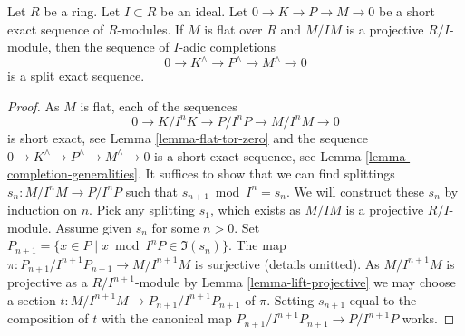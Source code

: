 \begin{lemma}
\label{lemma-split-completed-sequence}
Let $R$ be a ring. Let $I \subset R$ be an ideal.
Let $0 \to K \to P \to M \to 0$ be a short exact sequence of
$R$-modules. If $M$ is flat over $R$ and $M/IM$ is a projective
$R/I$-module, then the sequence of $I$-adic completions
$$
0 \to K^\wedge \to P^\wedge \to M^\wedge \to 0
$$
is a split exact sequence.
\end{lemma}

\begin{proof}
As $M$ is flat, each of the sequences
$$
0 \to K/I^nK \to P/I^nP \to M/I^nM \to 0
$$
is short exact, see
Lemma \ref{lemma-flat-tor-zero}
and the sequence $0 \to K^\wedge \to P^\wedge \to M^\wedge \to 0$
is a short exact sequence, see
Lemma \ref{lemma-completion-generalities}.
It suffices to show that we can find splittings
$s_n : M/I^nM \to P/I^nP$ such that $s_{n + 1} \bmod I^n = s_n$.
We will construct these $s_n$ by induction on $n$.
Pick any splitting $s_1$, which exists as $M/IM$ is a projective $R/I$-module.
Assume given $s_n$ for some $n > 0$. Set
$P_{n + 1} = \{x \in P \mid x \bmod I^nP \in \Im(s_n)\}$.
The map $\pi : P_{n + 1}/I^{n + 1}P_{n + 1} \to M/I^{n + 1}M$ is surjective
(details omitted). As $M/I^{n + 1}M$ is projective as a $R/I^{n + 1}$-module
by
Lemma \ref{lemma-lift-projective}
we may choose a section
$t : M/I^{n + 1}M \to P_{n + 1}/I^{n + 1}P_{n + 1}$
of $\pi$. Setting $s_{n + 1}$ equal to the composition of
$t$ with the canonical map $P_{n + 1}/I^{n + 1}P_{n + 1} \to P/I^{n + 1}P$
works.
\end{proof}
